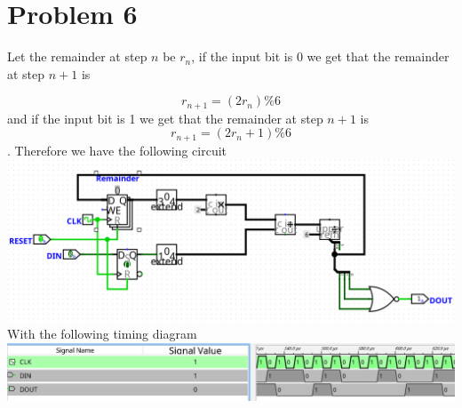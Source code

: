 \documentclass[12pt]{article}
\begin{document}
\section*{Problem 6}
Let the remainder at step $n$ be $r_n$, if the input bit is 0 we get that the remainder at step
$n+1$ is 

$$r_{n+1}=(2r_n)\% 6$$ and if the input bit is 1 we get that the remainder at step $n+1$ is $$r_{n+1}=(2r_n+1)\%6$$.
Therefore we have the following circuit
\\\includegraphics[scale=0.25]{Q6.png}
With the following timing diagram
\\\includegraphics[scale=0.3]{Q6timing.png}
\end{document}

